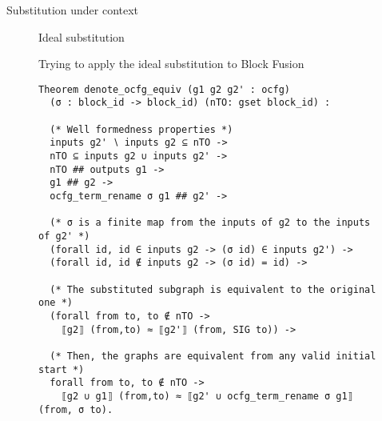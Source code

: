 \documentclass{beamer}
\begin{document}
\begin{frame}{Substitution under context}
  \begin{figure}
    \caption{Ideal substitution}
  \end{figure}
\end{frame}

\begin{frame}
  \begin{figure}
    \caption{Trying to apply the ideal substitution to Block Fusion}
  \end{figure}
\end{frame}

\begin{frame}[fragile]
  \begin{figure}
    \begin{lstlisting}[style=customcoq,basicstyle=\footnotesize\ttfamily]
Theorem denote_ocfg_equiv (g1 g2 g2' : ocfg)
  (σ : block_id -> block_id) (nTO: gset block_id) :

  (* Well formedness properties *)
  inputs g2' ∖ inputs g2 ⊆ nTO -> 
  nTO ⊆ inputs g2 ∪ inputs g2' -> 
  nTO ## outputs g1 ->
  g1 ## g2 -> 
  ocfg_term_rename σ g1 ## g2' ->

  (* σ is a finite map from the inputs of g2 to the inputs of g2' *)
  (forall id, id ∈ inputs g2 -> (σ id) ∈ inputs g2') ->
  (forall id, id ∉ inputs g2 -> (σ id) = id) ->
  
  (* The substituted subgraph is equivalent to the original one *)
  (forall from to, to ∉ nTO -> 
    ⟦g2⟧ (from,to) ≈ ⟦g2'⟧ (from, SIG to)) ->

  (* Then, the graphs are equivalent from any valid initial start *)
  forall from to, to ∉ nTO ->
    ⟦g2 ∪ g1⟧ (from,to) ≈ ⟦g2' ∪ ocfg_term_rename σ g1⟧ (from, σ to).
      \end{lstlisting}
    \label{fig:ocfg_equiv}
  \end{figure}
\end{frame}
\end{document}
